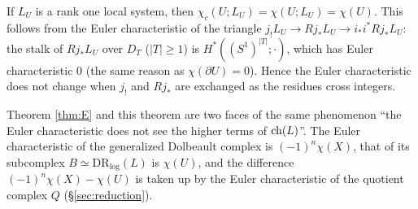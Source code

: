 \begin{cor}\tP\label{cor:wall}
If $L_U$ is a rank one local system, then $\chi_c(U;L_U)=\chi(U;L_U)=\chi(U)$. This follows from the Euler characteristic of the triangle $j_!L_U\to Rj_*L_U\to i_*i^*Rj_*L_U$: the stalk of $Rj_*L_U$ over $D_T$ ($|T|\ge1$) is $H^*((S^1)^{|T|};\cdot)$, which has Euler characteristic 0 (the same reason as $\chi(\partial U)=0$). Hence the Euler characteristic does not change when $j_!$ and $Rj_*$ are exchanged as the residues cross integers.
\end{cor}
\begin{rem}\tP
Theorem \ref{thm:E} and this theorem are two faces of the same phenomenon ``the Euler characteristic does not see the higher terms of $\mathrm{ch}(L)$''. The Euler characteristic of the generalized Dolbeault complex is $(-1)^n\chi(X)$, that of its subcomplex $B\simeq\mathrm{DR}_{\log}(L)$ is $\chi(U)$, and the difference $(-1)^n\chi(X)-\chi(U)$ is taken up by the Euler characteristic of the quotient complex $Q$ (\S\ref{sec:reduction}).
\end{rem}
